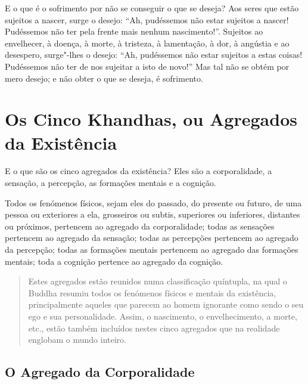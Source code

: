 E o que é o sofrimento por não se conseguir o que se deseja? Aos seres que estão
sujeitos a nascer, surge o desejo: ``Ah, pudéssemos não estar sujeitos a nascer!
Pudéssemos não ter pela frente mais nenhum nascimento!''. Sujeitos ao
envelhecer, à doença, à morte, à tristeza, à lamentação, à dor, à angústia e ao
desespero, surge"-lhes o desejo: ``Ah, pudéssemos não estar sujeitos a estas
coisas! Pudéssemos não ter de nos sujeitar a isto de novo!'' Mas tal não se
obtém por mero desejo; e não obter o que se deseja, é sofrimento.


\clearpage

\section{Os Cinco Khandhas, ou Agregados da Existência}


E o que são os cinco agregados da existência? Eles são a corporalidade, a
sensação, a percepção, as formações mentais e a cognição.


Todos os fenómenos físicos, sejam eles do passado, do presente ou futuro, de uma
pessoa ou exteriores a ela, grosseiros ou subtis, superiores ou inferiores,
distantes ou próximos, pertencem ao agregado da corporalidade; todas as
sensações pertencem ao agregado da sensação; todas as percepções pertencem ao
agregado da percepção; todas as formações mentais pertencem ao agregado das
formações mentais; toda a cognição pertence ao agregado da cognição.


\begin{quote}
  Estes agregados estão reunidos numa classificação quíntupla, na qual o Buddha
  resumiu todos os fenómenos físicos e mentais da existência, principalmente
  aqueles que parecem ao homem ignorante como sendo o seu ego e sua
  personalidade. Assim, o nascimento, o envelhecimento, a morte, etc., estão
  também incluídos nestes cinco agregados que na realidade englobam o mundo
  inteiro.
\end{quote}

\clearpage

\subsection{O Agregado da Corporalidade}


